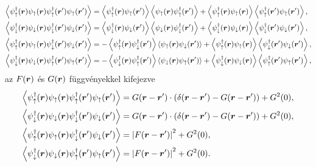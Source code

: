 \documentclass[a4paper,12pt,titlepage]{article}
\newcommand{\RR}{{\vb*{r}}}
\begin{document}
\begin{equation}
\begin{split} \label{density-components}
	\left< \psi_\uparrow^\dagger(\RR) \psi_\uparrow(\RR) \psi_\uparrow^\dagger(\RR^\prime) \psi_\uparrow(\RR^\prime) \right> & = \left< \psi_\uparrow^\dagger(\RR) \psi_\uparrow(\RR^\prime) \right> \left< \psi_\uparrow(\RR) \psi_\uparrow^\dagger(\RR^\prime) \right> + \left< \psi_\uparrow^\dagger(\RR) \psi_\uparrow(\RR) \right> \left< \psi_\uparrow^\dagger(\RR^\prime) \psi_\uparrow(\RR^\prime) \right>,  \\
	\left< \psi_\downarrow^\dagger(\RR) \psi_\downarrow(\RR) \psi_\downarrow^\dagger(\RR^\prime) \psi_\downarrow(\RR^\prime) \right> & = \left< \psi_\downarrow^\dagger(\RR) \psi_\downarrow(\RR^\prime) \right> \left< \psi_\downarrow(\RR) \psi_\downarrow^\dagger(\RR^\prime) \right> + \left< \psi_\downarrow^\dagger(\RR) \psi_\downarrow(\RR) \right> \left< \psi_\downarrow^\dagger(\RR^\prime) \psi_\downarrow(\RR^\prime) \right>,  \\
	\left< \psi_\uparrow^\dagger(\RR) \psi_\uparrow(\RR) \psi_\downarrow^\dagger(\RR^\prime) \psi_\downarrow(\RR^\prime) \right> & = -\left< \psi_\uparrow^\dagger(\RR) \psi_\downarrow^\dagger(\RR^\prime) \right> \left< \psi_\uparrow(\RR) \psi_\downarrow(\RR^\prime) \right> + \left< \psi_\uparrow^\dagger(\RR) \psi_\uparrow(\RR) \right> \left< \psi_\downarrow^\dagger(\RR^\prime) \psi_\downarrow(\RR^\prime) \right>,  \\
	\left< \psi_\downarrow^\dagger(\RR) \psi_\downarrow(\RR) \psi_\uparrow^\dagger(\RR^\prime) \psi_\uparrow(\RR^\prime) \right> & = -\left< \psi_\downarrow^\dagger(\RR) \psi_\uparrow^\dagger(\RR^\prime) \right> \left< \psi_\downarrow(\RR) \psi_\uparrow(\RR^\prime) \right> + \left< \psi_\downarrow^\dagger(\RR) \psi_\downarrow(\RR) \right> \left< \psi_\uparrow^\dagger(\RR^\prime) \psi_\uparrow(\RR^\prime) \right>,
\end{split}
\end{equation}
az $F(\RR)$ és $G(\RR)$ függvényekkel kifejezve
\begin{equation} \label{correlators-F-G}
\begin{split}
	\left< \psi_\uparrow^\dagger(\RR) \psi_\uparrow(\RR) \psi_\uparrow^\dagger(\RR^\prime) \psi_\uparrow(\RR^\prime) \right> & = G(\RR - \RR^\prime) \cdot \left( \delta(\RR - \RR^\prime) - G(\RR - \RR^\prime) \right) + G^2(0), \\
	\left< \psi_\downarrow^\dagger(\RR) \psi_\downarrow(\RR) \psi_\downarrow^\dagger(\RR^\prime) \psi_\downarrow(\RR^\prime) \right> & = G(\RR - \RR^\prime) \cdot \left( \delta(\RR - \RR^\prime) - G(\RR - \RR^\prime) \right) + G^2(0), \\
	\left< \psi_\uparrow^\dagger(\RR) \psi_\uparrow(\RR) \psi_\downarrow^\dagger(\RR^\prime) \psi_\downarrow(\RR^\prime) \right> & = \left| F(\RR - \RR^\prime) \right|^2 + G^2(0), \\
	\left< \psi_\downarrow^\dagger(\RR) \psi_\downarrow(\RR) \psi_\uparrow^\dagger(\RR^\prime) \psi_\uparrow(\RR^\prime) \right> & = \left| F(\RR - \RR^\prime) \right|^2 + G^2(0).
\end{split}
\end{equation}
\end{document}
